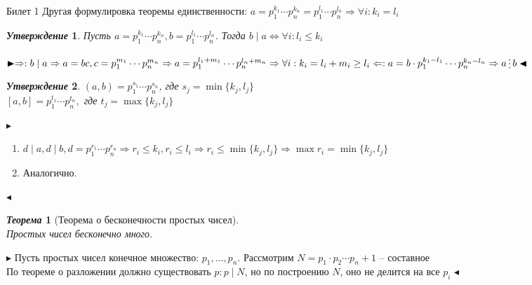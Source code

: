 \documentclass[a4paper,12pt]{article}
\newcommand{\divisible}{\mathop{\raisebox{-2pt}{\vdots}}}
\newtheorem{teo}{\textit{Теорема}}
\newtheorem{utv}{\textit{Утверждение}}
\newcommand{\q}{\quad}
\newcommand{\pb}{\blacktriangleright}
\newcommand{\pe}{\blacktriangleleft}
\newcommand{\Ra}{\Rightarrow}
\begin{document}
\newpage
\begin{mybox}{{Билет 1}}
Другая формулировка теоремы единственности: $a = p_1^{k_1}\cdots p_n^{k_n} = p_1^{l_1}\cdots p_n^{l_n}\Ra \forall i: k_i = l_i$\\
\begin{formbox}{}
\begin{utv} Пусть $a = p_1^{k_1}\cdots p_n^{k_n}, b = p_1^{l_1}\cdots p_n^{l_n}$. Тогда $b\mid a\iff \forall i: l_i \le k_i$
\end{utv}
\end{formbox}

$\pb  \Ra: b\mid a\Ra a = bc, c = p_1^{m_1}\cdots p_n^{m_n}\Ra a = p_1^{l_1 + m_1}\cdots p_n^{l_n + m_n}\Ra \forall i: k_i = l_i + m_i \ge l_i\\\q\\ \Leftarrow: a = b\cdot p_1^{k_1-l_1}\cdots p_n^{k_n - l_n}\Ra a\divisible b \pe$


\begin{formbox}{}
\begin{utv} $(a,b) = p_1^{s_1}\cdots p_n^{s_n}$, где $s_j = \min\{k_j, l_j\}$\\
$[a,b] = p_1^{t_1}\cdots p_n^{t_n},$ где $t_j = \max\{k_j, l_j\}$
\end{utv}
\end{formbox}

$\pb  $
\begin{enumerate}
\item $d\mid a, d\mid b, d = p_1^{r_1}\cdots p_n^{r_n}\Ra r_i\le k_i, r_i \le l_i\Ra r_i \le \min\{k_j, l_j\} \Ra \max r_i = \min\{k_j, l_j\}$
\item Аналогично.
\end{enumerate}
$\pe$


\begin{formbox}{}
\begin{teo}[Теорема о бесконечности простых чисел]\q\\
Простых чисел бесконечно много.
\end{teo}
\end{formbox}

$\pb$
Пусть простых чисел конечное множество: $p_1,\dots,p_n$. Рассмотрим $N = p_1\cdot p_2\cdots p_n + 1$ -- составное\\
По теореме о разложении должно существовать $p: p\mid N$, но по построению $N$, оно не делится на все $p_i$
$\pe$
\end{mybox}
\end{document}
